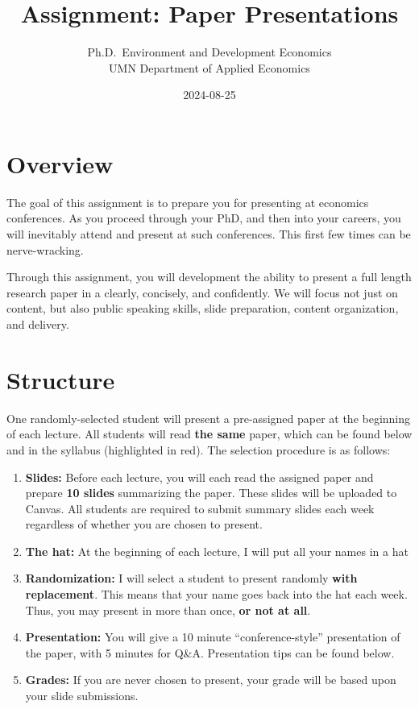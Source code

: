 \documentclass[
]{article}
\title{Assignment: Paper Presentations}
\subtitle{Ph.D.~Environment and Development Economics\\
UMN Department of Applied Economics}
\author{}
\date{\vspace{-2.5em}2024-08-25}
\begin{document}
\maketitle

\hypertarget{overview}{%
\section{Overview}\label{overview}}

The goal of this assignment is to prepare you for presenting at economics conferences. As you proceed through your PhD, and then into your careers, you will inevitably attend and present at such conferences. This first few times can be nerve-wracking.

Through this assignment, you will development the ability to present a full length research paper in a clearly, concisely, and confidently. We will focus not just on content, but also public speaking skills, slide preparation, content organization, and delivery.

\hypertarget{structure}{%
\section{Structure}\label{structure}}

One randomly-selected student will present a pre-assigned paper at the beginning of each lecture. All students will read \textbf{the same} paper, which can be found below and in the syllabus (highlighted in red). The selection procedure is as follows:

\begin{enumerate}
\def\labelenumi{\arabic{enumi}.}
\item
  \textbf{Slides:} Before each lecture, you will each read the assigned paper and prepare \textbf{10 slides} summarizing the paper. These slides will be uploaded to Canvas. All students are required to submit summary slides each week regardless of whether you are chosen to present.
\item
  \textbf{The hat:} At the beginning of each lecture, I will put all your names in a hat
\item
  \textbf{Randomization:} I will select a student to present randomly \textbf{with replacement}. This means that your name goes back into the hat each week. Thus, you may present in more than once, \textbf{or not at all}.
\item
  \textbf{Presentation:} You will give a 10 minute ``conference-style'' presentation of the paper, with 5 minutes for Q\&A. Presentation tips can be found below.
\item
  \textbf{Grades:} If you are never chosen to present, your grade will be based upon your slide submissions.
\end{enumerate}
\end{document}
